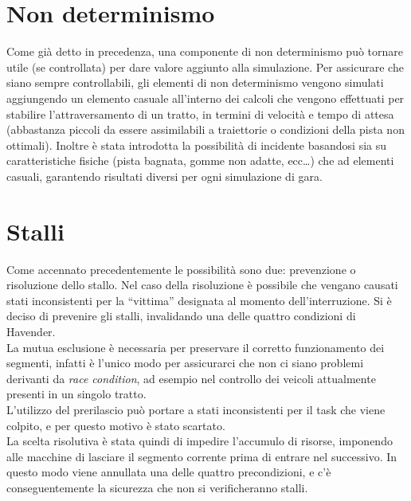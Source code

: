 \section{Non determinismo}

Come già detto in precedenza, una componente di non determinismo può tornare utile (se controllata) per dare valore aggiunto alla simulazione.
Per assicurare che siano sempre controllabili, gli elementi di non determinismo vengono simulati aggiungendo un elemento casuale all’interno dei calcoli che vengono effettuati per stabilire l’attraversamento di un tratto, in termini di velocità e tempo di attesa (abbastanza piccoli da essere assimilabili a traiettorie o condizioni della pista non ottimali). Inoltre è stata introdotta la possibilità di incidente basandosi sia su caratteristiche fisiche (pista bagnata, gomme non adatte, ecc…) che ad elementi casuali, garantendo risultati diversi per ogni simulazione di gara.


\section{Stalli}
Come accennato precedentemente le possibilità sono due: prevenzione o risoluzione dello stallo. Nel caso della risoluzione è possibile che vengano causati stati inconsistenti per la “vittima” designata al momento dell'interruzione.
Si è deciso di prevenire gli stalli, invalidando una delle quattro condizioni di Havender.\\
La mutua esclusione è necessaria per preservare il corretto funzionamento dei segmenti, infatti è l'unico modo per assicurarci che non ci siano problemi derivanti da \emph{race condition}, ad esempio nel controllo dei veicoli attualmente presenti in un singolo tratto.\\
L'utilizzo del prerilascio può portare a stati inconsistenti per il task che viene colpito, e per questo motivo è stato scartato.\\
La scelta risolutiva è stata quindi di impedire l'accumulo di risorse, imponendo alle macchine di lasciare il segmento corrente prima di entrare nel successivo. In questo modo viene annullata una delle quattro precondizioni, e c'è conseguentemente la sicurezza che non si verificheranno stalli.


